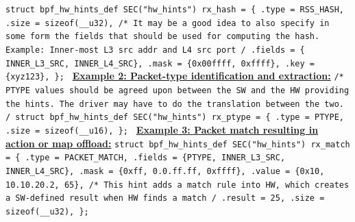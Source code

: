 \documentclass[letterpaper]{article}
\begin{document}
{\scriptsize \texttt{struct bpf\_hw\_hints\_def SEC("hw\_hints") rx\_hash = \{
\newline
\indent .type = RSS\_HASH,
\newline
\indent .size = sizeof(\_\_u32),
\newline
\indent /* It may be a good idea to also specify in some form
\newline
\indent \space * the fields that should be used for computing
\newline
\indent \space * the hash.
\newline
\indent \space * Example: Inner-most L3 src addr and L4 src port
\newline
\indent \space */
\newline
\indent .fields = \{ INNER\_L3\_SRC, INNER\_L4\_SRC\},
\newline
\indent .mask = \{0x00ffff, 0xffff\},
\newline
\indent .key = \{xyz123\},
\newline
\};
}}
\newline
\newline
\textbf{\underline{Example 2: Packet-type identification and extraction:}}
\newline
\newline
{\scriptsize \texttt{/* PTYPE values should be agreed upon between the
\newline
\space \space * SW and the HW providing the hints. The driver
\newline
\space \space * may have to do the translation between the two.
\newline
\space \space */
\newline
struct bpf\_hw\_hints\_def SEC("hw\_hints") rx\_ptype = \{
\newline
\indent .type = PTYPE,
\newline
\indent .size = sizeof(\_\_u16),
\newline
\};
}}
\newline
\newline
\textbf{\underline{Example 3: Packet match resulting in action or map offload:}}
\newline
\newline
{\scriptsize \texttt{struct bpf\_hw\_hints\_def SEC("hw\_hints") rx\_match = \{
\newline
\indent .type = PACKET\_MATCH,
\newline
\indent .fields = \{PTYPE, INNER\_L3\_SRC, INNER\_L4\_SRC\},
\newline
\indent .mask = \{0xff, 0.0.ff.ff, 0xffff\},
\newline
\indent .value = \{0x10, 10.10.20.2, 65\},
\newline
\indent /* This hint adds a match rule into HW, which creates a
\newline
\indent \space * SW-defined result when HW finds a match
\newline
\indent \space */
\newline
\indent .result = 25,
\newline
\indent .size = sizeof(\_\_u32),
\newline
\};
}}
\end{document}
